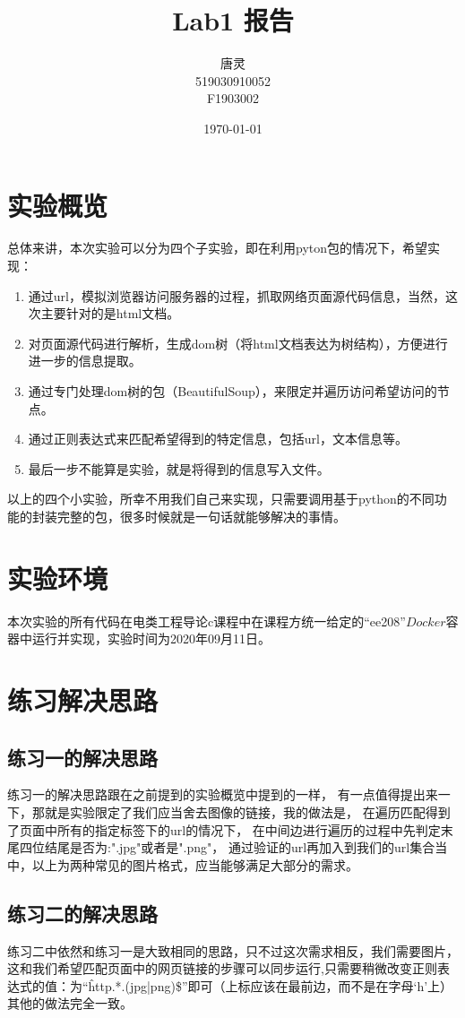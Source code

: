 \documentclass[UTF8]{ctexart}
\title{Lab1 报告}
\author{唐灵\\519030910052\\F1903002}
\date{\today}
\begin{document}
    \maketitle
    \section{实验概览}
        总体来讲，本次实验可以分为四个子实验，即在利用pyton包的情况下，希望实现：
        \begin{enumerate}
            \item 通过url，模拟浏览器访问服务器的过程，抓取网络页面源代码信息，当然，这次主要针对的是html文档。
            \item 对页面源代码进行解析，生成dom树（将html文档表达为树结构），方便进行进一步的信息提取。
            \item 通过专门处理dom树的包（BeautifulSoup），来限定并遍历访问希望访问的节点。
            \item 通过正则表达式来匹配希望得到的特定信息，包括url，文本信息等。
            \item 最后一步不能算是实验，就是将得到的信息写入文件。
        \end{enumerate}
        以上的四个小实验，所幸不用我们自己来实现，只需要调用基于python的不同功能的封装完整的包，很多时候就是一句话就能够解决的事情。
    \section{实验环境}
        本次实验的所有代码在电类工程导论c课程中在课程方统一给定的“ee208”$Docker$容器中运行并实现，实验时间为2020年09月11日。
    \section{练习解决思路}
        \subsection{练习一的解决思路}
            练习一的解决思路跟在之前提到的实验概览中提到的一样，
            有一点值得提出来一下，那就是实验限定了我们应当舍去图像的链接，我的做法是，
            在遍历匹配得到了页面中所有的指定标签下的url的情况下，
            在中间边进行遍历的过程中先判定末尾四位结尾是否为:".jpg"或者是".png"，
            通过验证的url再加入到我们的url集合当中，以上为两种常见的图片格式，应当能够满足大部分的需求。
        \subsection{练习二的解决思路}
            练习二中依然和练习一是大致相同的思路，只不过这次需求相反，我们需要图片，
            这和我们希望匹配页面中的网页链接的步骤可以同步运行,只需要稍微改变正则表达式的值：为“\^http.*.(jpg|png)\$”即可（上标应该在最前边，而不是在字母‘h’上）
            其他的做法完全一致。    
\end{document}
